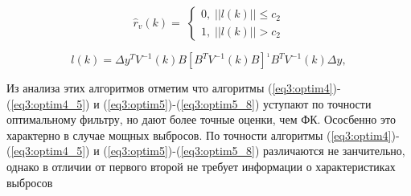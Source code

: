 \begin{equation}\label{eq3:optim5_7}
\hat{r}_v(k)= \;
\begin{cases}
0, \; ||l(k)||\leq c_2 \\    
1, \; ||l(k)||> c_2    
\end{cases}
\end{equation}

\begin{equation}\label{eq3:optim5_8}
l(k)=\Delta y^TV^{-1}(k)B[B^TV^{-1}(k)B]^{_1}B^TV^{-1}(k)\Delta y,
\end{equation}

Из анализа этих алгоритмов \cite{Klekis} отметим что алгоритмы (\ref{eq3:optim4})-(\ref{eq3:optim4_5}) и (\ref{eq3:optim5})-(\ref{eq3:optim5_8}) уступают по точности оптимальному фильтру, но дают более точные оценки, чем ФК.
Ососбенно это характерно в случае мощных выбросов.
По точности алгоритмы (\ref{eq3:optim4})-(\ref{eq3:optim4_5}) и (\ref{eq3:optim5})-(\ref{eq3:optim5_8}) различаются не занчительно, однако в отличии от первого второй не требует информации о характеристиках выбросов


